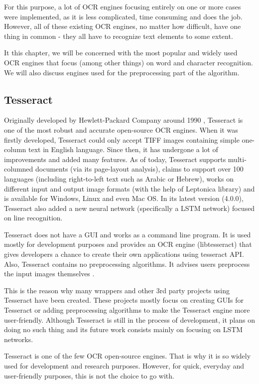 For this purpose, a lot of OCR engines focusing entirely on one or more cases were implemented, as it is less complicated, time consuming and does the job. However, all of these existing OCR engines, no matter how difficult, have one thing in common - they all have to recognize text elements to some extent.

It this chapter, we will be concerned with the most popular and widely used OCR engines that focus (among other things) on word and character recognition. We will also discuss engines used for the preprocessing part of the algorithm.

\subsection{Tesseract}

Originally developed by Hewlett-Packard Company around 1990 \citep{TesseractGIT}, Tesseract is one of the most robust and accurate open-source OCR engines. When it was firstly developed, Tesseract could only accept TIFF images containing simple one-column text in English language. Since then, it has undergone a lot of improvements and added many features. As of today, Tesseract supports multi-columned documents (via its page-layout analysis), claims to support over 100 languages (including right-to-left text such as Arabic or Hebrew), works on different input and output image formats (with the help of Leptonica \citep{LeptonicaLIB} library) and is available for Windows, Linux and even Mac OS. In its latest version (4.0.0), Tesseract also added a new neural network (specifically a LSTM network) focused on line recognition. 

Tesseract does not have a GUI and works as a command line program. It is used mostly for development purposes and provides an OCR engine (libtesseract) that gives developers a chance to create their own applications using tesseract API. Also, Tesseract contains no preprocessing algorithms. It advises users preprocess the input images themselves \citep{TesseractQual}.

This is the reason why many wrappers and other 3rd party projects using Tesseract have been created. These projects mostly focus on creating GUIs for Tesseract or adding preprocessing algorithms to make the Tesseract engine more user-friendly. Although Tesseract is still in the process of development, it plans on doing no such thing and its future work consists mainly on focusing on LSTM networks.

Tesseract is one of the few OCR open-source engines. That is why it is so widely used for development and research purposes. However, for quick, everyday and user-friendly purposes, this is not the choice to go with.

